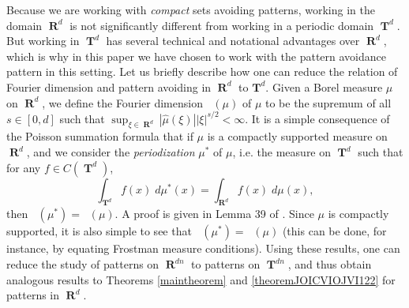 \documentclass[dvipsnames,letterpaper,12pt]{article}
\numberwithin{equation}{section}
\DeclareMathOperator{\hausdim}{\dim_{\mathbf{H}}}
\DeclareMathOperator{\fordim}{\dim_{\mathbf{F}}}
\DeclareMathOperator{\RR}{\mathbf{R}}
\DeclareMathOperator{\TT}{\mathbf{T}}
\numberwithin{theorem}{section}
\begin{document}
Because we are working with \emph{compact} sets avoiding patterns, working in the domain $\RR^d$ is not significantly different from working in a periodic domain $\TT^d$. But working in $\TT^d$ has several technical and notational advantages over $\RR^d$, which is why in this paper we have chosen to work with the pattern avoidance pattern in this setting. Let us briefly describe how one can reduce the relation of Fourier dimension and pattern avoiding in $\RR^d$ to $\mathbf{T}^d$. Given a Borel measure $\mu$ on $\RR^d$, we define the Fourier dimension $\fordim(\mu)$ of $\mu$ to be the supremum of all $s \in [0,d]$ such that $\sup_{\xi \in \RR^d} |\widehat{\mu}(\xi)| |\xi|^{s/2} < \infty$. It is a simple consequence of the Poisson summation formula that if $\mu$ is a compactly supported measure on $\RR^d$, and we consider the  \emph{periodization} $\mu^*$ of $\mu$, i.e. the measure on $\TT^d$ such that for any $f \in C(\TT^d)$,
%
\begin{equation}
    \int_{\TT^d} f(x)\; d\mu^*(x) = \int_{\RR^d} f(x)\; d\mu(x),
\end{equation}
%
then $\fordim(\mu^*) = \fordim(\mu)$. A proof is given in Lemma 39 of \cite{myThesis}. Since $\mu$ is compactly supported, it is also simple to see that $\hausdim(\mu^*) = \hausdim(\mu)$ (this can be done, for instance, by equating Frostman measure conditions). Using these results, one can reduce the study of patterns on $\RR^{dn}$ to patterns on $\TT^{dn}$, and thus obtain analogous results to Theorems \ref{maintheorem} and \ref{theoremJOICVIOJVI122} for patterns in $\RR^d$.

\begin{comment}
It is expected that Theorem \ref{theoremJOICVIOJVI122} is tight for general patterns $Z$. If $E$ is Salem and has dimension $d/(n-1)$, then $f(E^n)$ is a subset of $\TT^{d(n-1)}$ with nonempty interior, because
%
\begin{align*}
    \int e^{-2 \pi i \xi \cdot y} df_*(\mu^{\otimes})(y) &= \int e^{-2 \pi i \xi \cdot f(x)} d\mu(x_1) \dots d\mu(x_n)\\
    &= \lim_{k \to \infty} \int e^{-2 \pi i \xi \cdot f(x)} \phi^{\otimes}_k(x) dx\\
    &= \lim_{k \to \infty} \int e^{-2 \pi i \xi \cdot (x_1 + \dots + x_n)} \det(D_{x_1} f) \phi_k(g(z,x_2,\dots,x_n)) \phi_k^{\otimes}(x)\; dx
\end{align*}
%
where $f(g(z,x_2,\dots,x_n),x_2,\dots,x_n) = z$.
On the other hand, for patterns with richer structure this result is certainly non-optimal. For instance, in BLAH a Salem set in $\RR$ of dimension one is constructed avoiding solutions to the equation $x_3 = 2x_2 - x_1$; our techniques only guarantee the existence of a Salem set of dimension $1/2$.
\end{comment}
\end{document}
